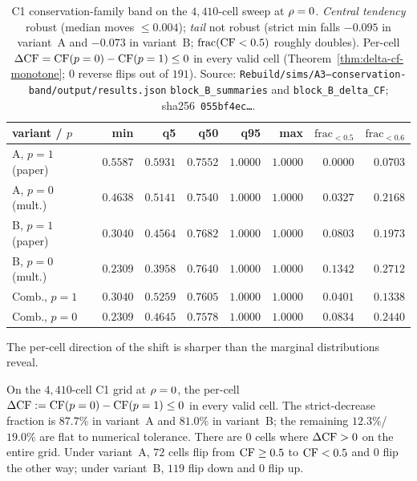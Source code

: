 \begin{table}[t]
  \centering
  \small
  \caption{C1 conservation-family band on the $4{,}410$-cell sweep
    at $\rho = 0$. \emph{Central tendency} robust (median moves
    $\le 0.004$); \emph{tail} not robust (strict min falls $-0.095$
    in variant~A and $-0.073$ in variant~B; $\mathrm{frac}(\mathrm{CF} < 0.5)$
    roughly doubles). Per-cell $\Delta\mathrm{CF} = \mathrm{CF}(p = 0) - \mathrm{CF}(p = 1)
    \le 0$ in every valid cell (Theorem~\ref{thm:delta-cf-monotone};
    $0$ reverse flips out of $191$). Source: \texttt{Rebuild/sims/A3--conservation-band/}\allowbreak\texttt{output/results.json}
    \texttt{block\_B\_summaries} and \texttt{block\_B\_delta\_CF};
    sha256~\texttt{055bf4ec\ldots}.}
  \label{tab:a3-c1-cf-band}
  \begin{tabular}{l r r r r r r r}
    \toprule
    {\bfseries variant / $p$} & min & q5 & q50 & q95 & max & $\mathrm{frac}_{<0.5}$ & $\mathrm{frac}_{<0.6}$ \\
    \midrule
    A, $p = 1$ (paper) & $0.5587$ & $0.5931$ & $0.7552$ & $1.0000$ & $1.0000$ & $0.0000$ & $0.0703$ \\
    A, $p = 0$ (mult.) & $0.4638$ & $0.5141$ & $0.7540$ & $1.0000$ & $1.0000$ & $0.0327$ & $0.2168$ \\
    \addlinespace
    B, $p = 1$ (paper) & $0.3040$ & $0.4564$ & $0.7682$ & $1.0000$ & $1.0000$ & $0.0803$ & $0.1973$ \\
    B, $p = 0$ (mult.) & $0.2309$ & $0.3958$ & $0.7640$ & $1.0000$ & $1.0000$ & $0.1342$ & $0.2712$ \\
    \addlinespace
    Comb., $p = 1$     & $0.3040$ & $0.5259$ & $0.7605$ & $1.0000$ & $1.0000$ & $0.0401$ & $0.1338$ \\
    Comb., $p = 0$     & $0.2309$ & $0.4645$ & $0.7578$ & $1.0000$ & $1.0000$ & $0.0834$ & $0.2440$ \\
    \bottomrule
  \end{tabular}
\end{table}

The per-cell direction of the shift is sharper than the marginal
distributions reveal.

\begin{theorem}
\label{thm:delta-cf-monotone}
On the $4{,}410$-cell C1 grid at $\rho = 0$, the per-cell
$\Delta\mathrm{CF} := \mathrm{CF}(p = 0) - \mathrm{CF}(p = 1) \le 0$ in every valid cell.
The strict-decrease fraction is $87.7\%$ in variant~A and $81.0\%$ in
variant~B; the remaining $12.3\%$/$19.0\%$ are flat to numerical
tolerance. There are $0$ cells where $\Delta\mathrm{CF} > 0$ on the entire
grid. Under variant~A, $72$ cells flip from $\mathrm{CF} \ge 0.5$ to
$\mathrm{CF} < 0.5$ and $0$ flip the other way; under variant~B, $119$ flip
down and $0$ flip up.
\end{theorem}

